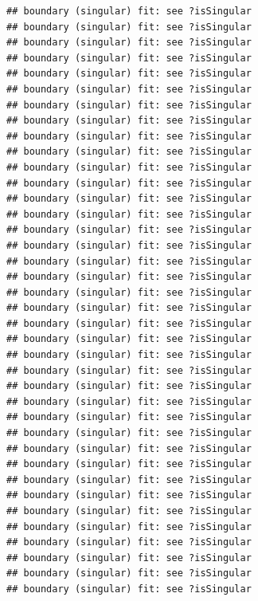 \documentclass[
]{article}
\begin{document}
\begin{verbatim}
## boundary (singular) fit: see ?isSingular
## boundary (singular) fit: see ?isSingular
## boundary (singular) fit: see ?isSingular
## boundary (singular) fit: see ?isSingular
## boundary (singular) fit: see ?isSingular
## boundary (singular) fit: see ?isSingular
## boundary (singular) fit: see ?isSingular
## boundary (singular) fit: see ?isSingular
## boundary (singular) fit: see ?isSingular
## boundary (singular) fit: see ?isSingular
## boundary (singular) fit: see ?isSingular
## boundary (singular) fit: see ?isSingular
## boundary (singular) fit: see ?isSingular
## boundary (singular) fit: see ?isSingular
## boundary (singular) fit: see ?isSingular
## boundary (singular) fit: see ?isSingular
## boundary (singular) fit: see ?isSingular
## boundary (singular) fit: see ?isSingular
## boundary (singular) fit: see ?isSingular
## boundary (singular) fit: see ?isSingular
## boundary (singular) fit: see ?isSingular
## boundary (singular) fit: see ?isSingular
## boundary (singular) fit: see ?isSingular
## boundary (singular) fit: see ?isSingular
## boundary (singular) fit: see ?isSingular
## boundary (singular) fit: see ?isSingular
## boundary (singular) fit: see ?isSingular
## boundary (singular) fit: see ?isSingular
## boundary (singular) fit: see ?isSingular
## boundary (singular) fit: see ?isSingular
## boundary (singular) fit: see ?isSingular
## boundary (singular) fit: see ?isSingular
## boundary (singular) fit: see ?isSingular
## boundary (singular) fit: see ?isSingular
## boundary (singular) fit: see ?isSingular
## boundary (singular) fit: see ?isSingular
## boundary (singular) fit: see ?isSingular
## boundary (singular) fit: see ?isSingular
\end{verbatim}
\end{document}
